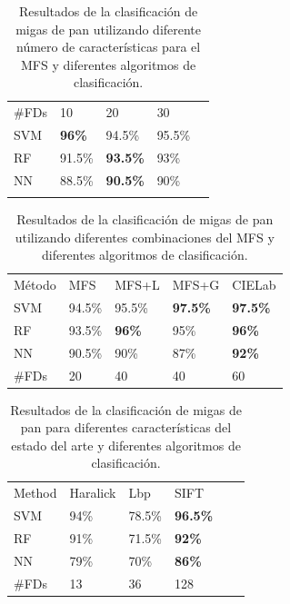 \begin{table}[h!]
\center
\caption{Resultados de la clasificación de migas de pan utilizando diferente número de características para el MFS y diferentes algoritmos de clasificación.}
\label{tab:number}       %
\begin{tabular}{lllll}
\hline\noalign{\smallskip}
\#FDs & 10  & 20 & 30 \\
\noalign{\smallskip}\hline\noalign{\smallskip}
SVM & \textbf{96\%} & 94.5\% & 95.5\% \\
RF  & 91.5\% & \textbf{93.5\%} & 93\% \\
NN & 88.5\% & \textbf{90.5\%} & 90\% \\
\noalign{\smallskip}\hline
\end{tabular}
\end{table}


\begin{table}[h!]
\center
\caption{Resultados de la clasificación de migas de pan utilizando diferentes combinaciones del MFS y diferentes algoritmos de clasificación.}
\label{tab:mfs}       %
\begin{tabular}{lllll}
\hline\noalign{\smallskip}
Método & MFS & MFS+L & MFS+G & CIELab  \\
\noalign{\smallskip}\hline\noalign{\smallskip}
SVM & 94.5\% & 95.5\% & \textbf{97.5\%} & \textbf{97.5\%} \\
RF  & 93.5\% & \textbf{96\%} & 95\% & \textbf{96\%} \\
NN & 90.5\% & 90\% & 87\% & \textbf{92\%} \\
\noalign{\smallskip}\hline
\#FDs & 20 & 40 & 40 & 60 \\
\hline
\end{tabular}
\end{table}

\begin{table}[h!]
\center
\caption{Resultados de la clasificación de migas de pan para diferentes características del estado del arte y diferentes algoritmos de clasificación.}
\label{tab:other}       %
\begin{tabular}{llllll}
\hline\noalign{\smallskip}
Method & Haralick & Lbp & SIFT\\ %
\noalign{\smallskip}\hline\noalign{\smallskip}
SVM & 94\% & 78.5\% & \textbf{96.5\%} \\ %
RF  & 91\% & 71.5\% & \textbf{92\%} \\ %
NN & 79\% & 70\% & \textbf{86\%} \\ %
\noalign{\smallskip}\hline
\#FDs & 13 & 36 & 128 \\
\hline
\end{tabular}
\end{table}

